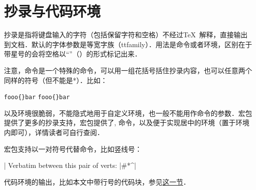 \section{抄录与代码环境}
抄录是指将键盘输入的字符（包括保留字符和空格）不经过\TeX\ 解释，直接输出到文档．默认的字体参数是等宽字族（ttfamily）．用法是命令或者环境，区别在于带星号的会将空格以“\textvisiblespace”（）的形式标记出来．

注意，命令是一个特殊的命令，可以用一组花括号括住抄录内容，也可以任意两个同样的符号（但不能是*）．比如：
\begin{latex}
\verb|fooo{}bar|
\verb+fooo{}bar+
\end{latex}

以及环境很脆弱，不能隐式地用于自定义环境，也一般不能用作命令的参数．宏包提供了更多的抄录支持，宏包提供了, 命令，以及便于实现居中的环境（置于环境内即可），详情读者可自行查阅．

宏包支持以一对符号代替命令，比如竖线号：
\begin{latex}
\MakeShortVerb|
Verbatim between this pair of verts: |#\?*^|
\end{latex}

代码环境的输出，比如本文中带行号的代码块，参见\hyperref[sec:coding]{这一节}．

